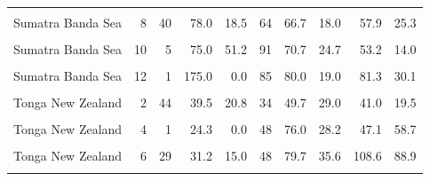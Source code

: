 \begin{ThreePartTable}
\begin{longtable}[t]{lrrrrrrrrr}
\cellcolor{gray!6}{Sumatra Banda Sea} & \cellcolor{gray!6}{7} & \cellcolor{gray!6}{86} & \cellcolor{gray!6}{70.5} & \cellcolor{gray!6}{31.5} & \cellcolor{gray!6}{72} & \cellcolor{gray!6}{71.7} & \cellcolor{gray!6}{24.7} & \cellcolor{gray!6}{70.1} & \cellcolor{gray!6}{31.7}\\
Sumatra Banda Sea & 8 & 40 & 78.0 & 18.5 & 64 & 66.7 & 18.0 & 57.9 & 25.3\\
\cellcolor{gray!6}{Sumatra Banda Sea} & \cellcolor{gray!6}{9} & \cellcolor{gray!6}{30} & \cellcolor{gray!6}{77.5} & \cellcolor{gray!6}{25.2} & \cellcolor{gray!6}{83} & \cellcolor{gray!6}{68.8} & \cellcolor{gray!6}{28.8} & \cellcolor{gray!6}{43.7} & \cellcolor{gray!6}{36.6}\\
Sumatra Banda Sea & 10 & 5 & 75.0 & 51.2 & 91 & 70.7 & 24.7 & 53.2 & 14.0\\
\cellcolor{gray!6}{Sumatra Banda Sea} & \cellcolor{gray!6}{11} & \cellcolor{gray!6}{1} & \cellcolor{gray!6}{71.2} & \cellcolor{gray!6}{0.0} & \cellcolor{gray!6}{67} & \cellcolor{gray!6}{72.3} & \cellcolor{gray!6}{12.4} & \cellcolor{gray!6}{60.9} & \cellcolor{gray!6}{5.7}\\
Sumatra Banda Sea & 12 & 1 & 175.0 & 0.0 & 85 & 80.0 & 19.0 & 81.3 & 30.1\\
\cellcolor{gray!6}{Tonga New Zealand} & \cellcolor{gray!6}{1} & \cellcolor{gray!6}{73} & \cellcolor{gray!6}{46.8} & \cellcolor{gray!6}{39.0} & \cellcolor{gray!6}{44} & \cellcolor{gray!6}{56.9} & \cellcolor{gray!6}{24.3} & \cellcolor{gray!6}{49.7} & \cellcolor{gray!6}{21.8}\\
Tonga New Zealand & 2 & 44 & 39.5 & 20.8 & 34 & 49.7 & 29.0 & 41.0 & 19.5\\
\cellcolor{gray!6}{Tonga New Zealand} & \cellcolor{gray!6}{3} & \cellcolor{gray!6}{30} & \cellcolor{gray!6}{64.0} & \cellcolor{gray!6}{36.0} & \cellcolor{gray!6}{64} & \cellcolor{gray!6}{73.6} & \cellcolor{gray!6}{38.2} & \cellcolor{gray!6}{91.1} & \cellcolor{gray!6}{80.5}\\
Tonga New Zealand & 4 & 1 & 24.3 & 0.0 & 48 & 76.0 & 28.2 & 47.1 & 58.7\\
\cellcolor{gray!6}{Tonga New Zealand} & \cellcolor{gray!6}{5} & \cellcolor{gray!6}{1} & \cellcolor{gray!6}{15.1} & \cellcolor{gray!6}{0.0} & \cellcolor{gray!6}{68} & \cellcolor{gray!6}{80.7} & \cellcolor{gray!6}{37.4} & \cellcolor{gray!6}{45.7} & \cellcolor{gray!6}{41.8}\\
Tonga New Zealand & 6 & 29 & 31.2 & 15.0 & 48 & 79.7 & 35.6 & 108.6 & 88.9\\
\cellcolor{gray!6}{Tonga New Zealand} & \cellcolor{gray!6}{7} & \cellcolor{gray!6}{35} & \cellcolor{gray!6}{28.5} & \cellcolor{gray!6}{7.1} & \cellcolor{gray!6}{53} & \cellcolor{gray!6}{71.9} & \cellcolor{gray!6}{24.0} & \cellcolor{gray!6}{53.1} & \cellcolor{gray!6}{30.2}\\

\end{longtable}
\end{ThreePartTable}
